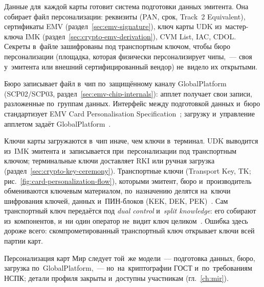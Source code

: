 Данные для~каждой карты готовит система подготовки данных эмитента. Она собирает файл персонализации:
реквизиты (PAN, срок, Track~2 Equivalent), сертификаты EMV
(раздел~\ref{sec:emv-signature}), ключ карты UDK из~мастер-ключа IMK
(раздел~\ref{sec:crypto-emv-derivation}), CVM List, IAC, CDOL. Секреты в~файле
зашифрованы под транспортным ключом, чтобы бюро персонализации (площадка,
  которая физически персонализирует чипы,~--- своя у~эмитента или внешний
сертифицированный вендор) не~видело их открытыми.

Бюро записывает файл в~чип по~защищённому каналу GlobalPlatform
(SCP02\slash SCP03, раздел~\ref{sec:emv-chip-internals}): апплет получает свои
записи, разложенные по~группам данных. Интерфейс между подготовкой данных
и~бюро стандартизует EMV Card Personalisation Specification~\cite{emvco-cps};
загрузку и~управление апплетом задаёт GlobalPlatform~\cite{globalplatform-card}.

Ключи карты загружаются в~чип иначе, чем ключи в~терминал. UDK выводится из~IMK
эмитента и~записывается при~персонализации под транспортным ключом;
терминальные ключи доставляет RKI или ручная загрузка
(раздел~\ref{sec:crypto-key-ceremony}). Транспортные ключи
(Transport Key, TK; рис.~\ref{fig:card-personalization-flow}), которыми эмитент, бюро и~производитель
обмениваются ключевым материалом, по~назначению делятся на~ключи шифрования
ключей, данных и~ПИН-блоков (KEK, DEK, PEK)~\cite{emvco-cps}. Сам транспортный ключ
передаётся под \textit{dual control} и~\textit{split knowledge}: его собирают из~компонентов,
и~ни один оператор не~видит ключ целиком~\cite{visa-vsdc-guide}.
Ошибка здесь дороже всего: скомпрометированный транспортный ключ открывает ключи
всей партии карт.

Персонализация карт Мир следует той~же модели~--- подготовка данных, бюро,
загрузка по~GlobalPlatform,~--- но~на~криптографии ГОСТ и~по~требованиям НСПК;
детали профиля закрыты и~доступны участникам (гл.~\ref{ch:mir}).
